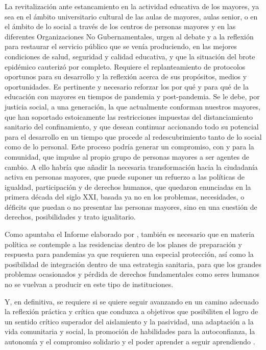 \documentclass[spanish]{textolivre}
\begin{document}
La revitalización ante estancamiento en la actividad educativa de los mayores, ya sea en el ámbito universitario cultural de las aulas de mayores, aulas senior, o en el ámbito de lo social a través de los centros de personas mayores y en las diferentes Organizaciones No Gubernamentales, urgen al debate y a la reflexión para restaurar el servicio público que se venía produciendo, en las mejores condiciones de salud, seguridad y calidad educativa, y que la situación del brote epidémico cauterizó por completo. Requiere el replanteamiento de protocolos oportunos para su desarrollo y la reflexión acerca de sus propósitos, medios y oportunidades. Es pertinente y necesario reforzar los por qué y para qué de la educación con mayores en tiempos de pandemia y post-pandemia. Se le debe, por justicia social, a una generación, la que actualmente conforman nuestros mayores, que han soportado estoicamente las restricciones impuestas del distanciamiento sanitario del confinamiento, y que desean continuar accionando todo su potencial para el desarrollo en un tiempo que procede al redescubrimiento tanto de lo social como de lo personal. Este proceso podría generar un compromiso, con y para la comunidad, que impulse al propio grupo de personas mayores a ser agentes de cambio. A ello habría que añadir la necesaria transformación hacia la ciudadanía activa en personas mayores, que puede suponer un refuerzo a las políticas de igualdad, participación y de derechos humanos, que quedaron enunciadas en la primera década del siglo XXI, basada ya no en los problemas, necesidades, o déficits que puedan o no presentar las personas mayores, sino en una cuestión de derechos, posibilidades y trato igualitario.

Como apuntaba el Informe elaborado por \textcite{del_pino2020}, %
también es necesario que en materia política se contemple a las residencias dentro de los planes de preparación y respuesta para pandemias ya que requieren una especial protección, así como la posibilidad de integración dentro de una estrategia sanitaria, para que los grandes problemas ocasionados y pérdida de derechos fundamentales como seres humanos no se vuelvan a producir en este tipo de instituciones.

Y, en definitiva, se requiere si se quiere seguir avanzando en un camino adecuado la reflexión práctica y crítica que conduzca a objetivos que posibiliten el logro de un sentido crítico superador del aislamiento y la pasividad, una adaptación a la vida comunitaria y social, la promoción  de habilidades para la autoconfianza, la autonomía y el compromiso solidario y el poder aprender a seguir aprendiendo \cite{martinezdemiguel2017}. %
\end{document}
